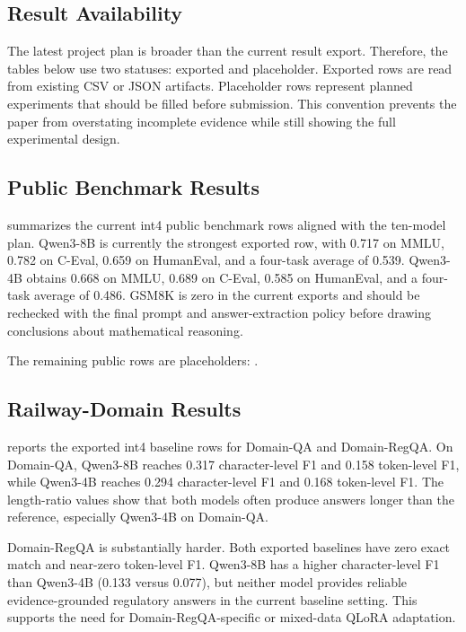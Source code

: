 \label{sec:results}

\subsection{Result Availability}

The latest project plan is broader than the current result export. Therefore,
the tables below use two statuses: exported and placeholder. Exported rows are
read from existing CSV or JSON artifacts. Placeholder rows represent planned
experiments that should be filled before submission. This convention prevents
the paper from overstating incomplete evidence while still showing the full
experimental design.

\subsection{Public Benchmark Results}

 summarizes the current int4 public benchmark rows
aligned with the ten-model plan. Qwen3-8B is currently the strongest exported
row, with 0.717 on MMLU, 0.782 on C-Eval, 0.659 on HumanEval, and a four-task
average of 0.539. Qwen3-4B obtains 0.668 on MMLU, 0.689 on C-Eval, 0.585 on
HumanEval, and a four-task average of 0.486. GSM8K is zero in the current
exports and should be rechecked with the final prompt and answer-extraction
policy before drawing conclusions about mathematical reasoning.



The remaining public rows are placeholders:
.

\subsection{Railway-Domain Results}

 reports the exported int4 baseline rows for
Domain-QA and Domain-RegQA. On Domain-QA, Qwen3-8B reaches 0.317
character-level F1 and 0.158 token-level F1, while Qwen3-4B reaches 0.294
character-level F1 and 0.168 token-level F1. The length-ratio values show that
both models often produce answers longer than the reference, especially
Qwen3-4B on Domain-QA.

Domain-RegQA is substantially harder. Both exported baselines have zero exact
match and near-zero token-level F1. Qwen3-8B has a higher character-level F1
than Qwen3-4B (0.133 versus 0.077), but neither model provides reliable
evidence-grounded regulatory answers in the current baseline setting. This
supports the need for Domain-RegQA-specific or mixed-data QLoRA adaptation.

